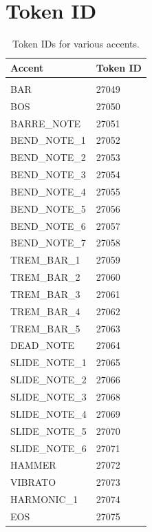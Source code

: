 \documentclass{article} %
\begin{document}
\section{Token ID}\label{app:secA1}
\begin{table}[!h]
\caption{Token IDs for various accents.}
\label{tab:k}
\begin{center}
  \begin{tabular}{ll}
  \bfseries Accent & \bfseries Token ID
  \\ \hline \\
BAR  & 27049\\
BOS  & 27050\\
BARRE\_NOTE & 27051\\
BEND\_NOTE\_1 & 27052\\
BEND\_NOTE\_2 & 27053\\
BEND\_NOTE\_3 & 27054\\
BEND\_NOTE\_4 & 27055\\
BEND\_NOTE\_5 & 27056\\
BEND\_NOTE\_6 & 27057\\
BEND\_NOTE\_7 & 27058\\
TREM\_BAR\_1 & 27059\\
TREM\_BAR\_2 & 27060\\
TREM\_BAR\_3 & 27061\\
TREM\_BAR\_4 & 27062\\
TREM\_BAR\_5 & 27063\\
DEAD\_NOTE & 27064\\
SLIDE\_NOTE\_1 & 27065\\
SLIDE\_NOTE\_2 & 27066\\
SLIDE\_NOTE\_3 & 27068\\
SLIDE\_NOTE\_4 & 27069\\
SLIDE\_NOTE\_5 & 27070\\
SLIDE\_NOTE\_6 & 27071\\
HAMMER & 27072\\
VIBRATO & 27073\\
HARMONIC\_1 & 27074\\
EOS  & 27075\\
  \end{tabular}
\end{center}
\end{table}
\end{document}
